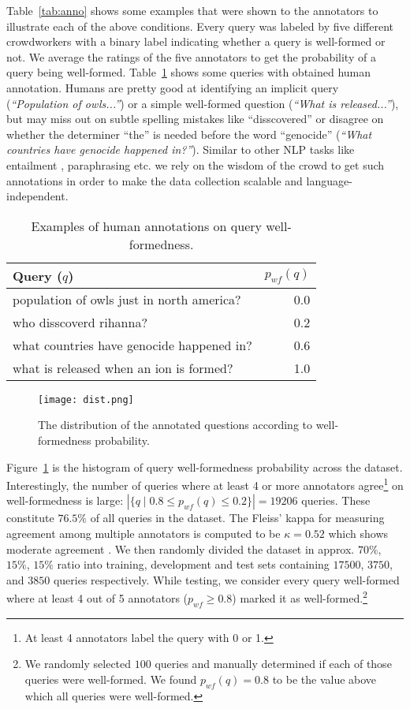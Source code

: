 \documentclass[11pt,a4paper]{article}
\begin{document}
Table~\ref{tab:anno} shows some examples that were shown to the annotators
to illustrate each of the above conditions. Every query was labeled by five
different crowdworkers with a binary label indicating whether a query is
well-formed or not. We average the ratings of the five annotators to
get the probability of a query being well-formed. 
Table~\ref{tab:labeledqueries} shows some queries with obtained human annotation.
Humans are pretty good at identifying an implicit query (\textit{``Population of
owls...''}) or a simple well-formed question (\textit{``What is released...''}), but
may miss out on subtle spelling mistakes like ``disscovered'' or disagree on
whether the determiner ``the'' is needed before the word ``genocide'' (\textit{``What countries have genocide happened in?''}).
Similar to other NLP tasks like entailment \cite{dagan2006pascal,bowman:2015}, 
paraphrasing \cite{meandev} etc. we rely on the wisdom of the
crowd to get such annotations in order to make the
data collection scalable and language-independent.

\begin{table}[!tb]
\centering
\begin{tabular}{|p{5.5cm}|r|}
\hline
Query ($q$) & $p_{wf}(q)$ \\
\hline
population of owls just in north america? & 0.0 \\
who disscoverd rihanna? & 0.2 \\
what countries have genocide happened in? & 0.6 \\
what is released when an ion is formed? & 1.0 \\
\hline
\end{tabular}
\label{tab:labeledqueries}
\caption{Examples of human annotations on query well-formedness.}
\end{table}

\begin{figure}[!tb]
    \centering
    \texttt{[image: dist.png]}
    \caption{The distribution of the annotated questions according
    to well-formedness probability.}
    \label{fig:dist}
\end{figure}

Figure~\ref{fig:dist} is the histogram of query well-formedness probability across
the dataset. Interestingly, the number of queries where at least 4 or more annotators 
agree\footnote{At least 4 annotators label the query with 0 or 1.} on
well-formedness is large:
$|\{ q \mid 0.8 \le p_{wf}(q) \le 0.2\}| = 19206$
queries. These constitute $76.5\%$ of all queries in the dataset. 
The Fleiss' kappa \cite{fleiss1971measuring} for measuring agreement among multiple
annotators is computed to be $\kappa=0.52$ which shows moderate agreement \cite{landis1977measurement}.
We then randomly divided the dataset in approx. $70\%$, $15\%$, $15\%$ ratio into
training, development and test sets containing $17500$, $3750$, and $3850$ queries respectively.  While testing, we consider every query well-formed where at least 4 out of 5 
annotators ($p_{wf}\ge0.8 $) marked it as well-formed.\footnote{We randomly selected $100$ queries and
manually determined if each of those queries were well-formed. We found $p_{wf}(q)=0.8$ to be the
value above which all queries were well-formed.}
\end{document}
